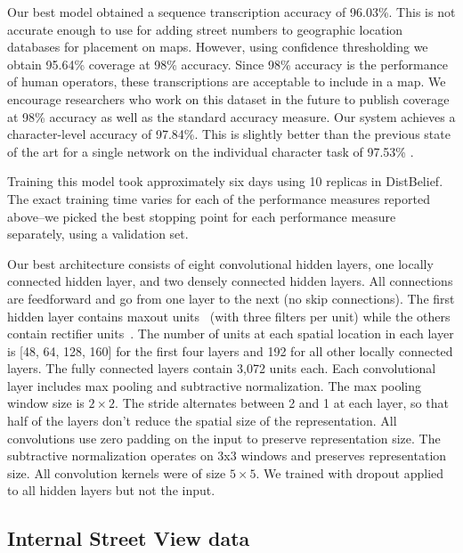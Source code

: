 \documentclass{article} \usepackage{comment}
\begin{document}
Our best model obtained a sequence transcription accuracy of 96.03\%. This is not accurate enough to
use for adding street numbers to geographic location databases for placement on maps.
However, using confidence thresholding we obtain 95.64\% coverage at 98\% accuracy.
Since 98\% accuracy is the performance of human operators, these transcriptions are acceptable to include
in a map. We encourage researchers who work on this dataset in the future to publish coverage at 98\% accuracy
as well as the standard accuracy measure. Our system achieves a character-level accuracy of 97.84\%. This is
slightly better than the previous state of the art for a single network on the individual character task of
97.53\% \citep{Goodfellow-et-al-ICML2013}.

Training this model took approximately six days using 10 replicas in DistBelief. The exact training time varies
for each of the performance measures reported above--we picked the best stopping point for each performance measure
separately, using a validation set.

Our best architecture consists of eight convolutional hidden layers, one locally connected hidden layer, and two densely 
connected hidden layers. All connections are feedforward and go from one layer to the next (no skip connections). 
The first hidden layer contains maxout units~\citep{Goodfellow-et-al-ICML2013} (with three filters per unit) while
the others contain rectifier units~\citep{Jarrett-ICCV2009,Glorot+al-AI-2011}.
The number of units at each spatial location in each layer is
[48, 64, 128, 160] for the first four layers and 192 for all other locally connected layers. The fully connected layers
contain 3,072 units each.
Each convolutional layer includes max pooling and subtractive normalization. The max pooling window size is $2 \times 2$.
The stride alternates between 2 and 1 at each layer, so that half of the layers don't reduce the spatial size of
the representation. All convolutions use zero padding on the input to preserve representation size. The subtractive
normalization operates on 3x3 windows and preserves representation size. All convolution kernels were of size $5 \times 5$.
We trained with dropout applied to all hidden layers but not the input. 

\subsection{Internal Street View data}
\label{subsec:internal}
\end{document}
